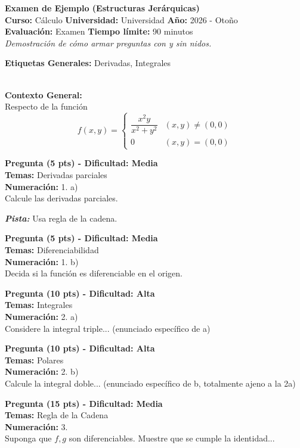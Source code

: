 \documentclass[12pt]{article}
\newcommand{\evalMeta}[9]{
  \begin{center}
    {\Large \textbf{#2}}\\[0.2cm]
    \textbf{Curso:} #4 \quad \textbf{Universidad:} #5 \quad \textbf{Año:} #6 - #7\\[0.1cm]
    \textbf{Evaluación:} #8 \quad \textbf{Tiempo límite:} #9 minutos\\[0.3cm]
    \textit{#3}
  \end{center}
  \vspace{0.5cm}
}
\newcommand{\evalTags}[1]{
  \textbf{Etiquetas Generales:} #1 \vspace{0.5cm}
}
\newenvironment{bloqueContexto}[1]{
  \vspace{0.5cm}\noindent\hrulefill\vspace{0.2cm}\\
  \noindent \textbf{Contexto General:}\\
  #1
  \vspace{0.3cm}
}{
  \vspace{0.5cm}
}
\newenvironment{pregunta}[4]{
  \vspace{0.3cm}\noindent\textbf{Pregunta (#2 pts) - Dificultad: #3}\\
  \textbf{Temas:} #4\\[0.2cm]
}{
  \vspace{0.3cm}
}
\newcommand{\numeracion}[1]{
  \vspace{-0.3cm}\noindent\textbf{Numeración:} #1 \\
}
\newcommand{\pista}[1]{
  \noindent \textbf{\textsl{Pista:}} #1 \\
}
\begin{document}
\evalMeta
  {examen-ejemplo}
  {Examen de Ejemplo (Estructuras Jerárquicas)}
  {Demostración de cómo armar preguntas con y sin nidos.}
  {Cálculo}
  {Universidad}
  {2026}
  {Otoño}
  {Examen}
  {90}

\evalTags{Derivadas, Integrales}

\begin{bloqueContexto}{
Respecto de la función
$$ f(x,y) = \begin{cases} \dfrac{x^2y}{x^2+y^2} & (x,y) \neq (0,0) \\ 0 & (x,y) = (0,0) \end{cases} $$
}

    \begin{pregunta}{q1-a}{5}{Media}{Derivadas parciales}
    \numeracion{1. a)}
    Calcule las derivadas parciales.
    \pista{Usa regla de la cadena.}
    \end{pregunta}

    \begin{pregunta}{q1-b}{5}{Media}{Diferenciabilidad}
    \numeracion{1. b)}
    Decida si la función es diferenciable en el origen.
    \end{pregunta}

\end{bloqueContexto}



\begin{pregunta}{q2-a}{10}{Alta}{Integrales}
\numeracion{2. a)}
Considere la integral triple... (enunciado específico de a)
\end{pregunta}

\begin{pregunta}{q2-b}{10}{Alta}{Polares}
\numeracion{2. b)}
Calcule la integral doble... (enunciado específico de b, totalmente ajeno a la 2a)
\end{pregunta}


\begin{pregunta}{q3}{15}{Media}{Regla de la Cadena}
\numeracion{3.}
Suponga que $f,g$ son diferenciables. Muestre que se cumple la identidad...
\end{pregunta}
\end{document}
